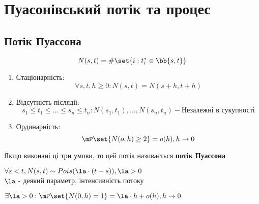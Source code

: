 \section{Пуасонівський потік та процес} 
\subsection{Потік Пуассона}
\begin{equation}
	N(s,t) = \# \set{i:t^\ast_i \in \bb{s,t}}
\end{equation}
\begin{enumerate}
	\item Стаціонарність: 
	\begin{equation}
		\forall s,t,h\geq 0: N(s,t) = N(s+h,t+h)
	\end{equation}
	\item Відсутність післядії:
	\begin{equation}
		s_1\leq t_1 \leq\ldots\leq s_n\leq t_n: N(s_1,t_1),\ldots,N(s_n,t_n) - \text{Незалежні в сукупності}
	\end{equation}
	\item Ординарність:
	\begin{equation}
		\mP\set{N(o,h)\geq 2} = o(h),h\to 0
	\end{equation}
\end{enumerate}
Якщо виконані ці три умови, то цей потік називається {\bf потік Пуассона}
\begin{teor}
	$\forall s<t, N(s,t) \sim Pois(\la\cdot (t-s)),\la>0$\\
	$\la$ - деякий параметр, інтенсивність потоку
\end{teor}
\begin{teor}
	$\exists \la>0: \mP\set{N(0,h)=1}=\la\cdot h + o(h),h\to 0$
\end{teor}
